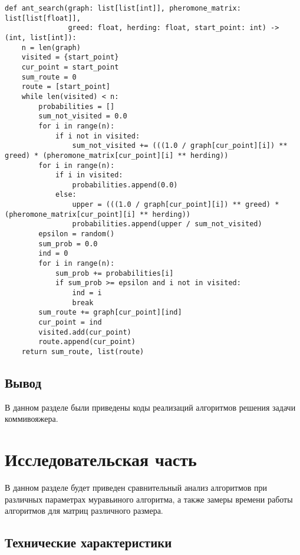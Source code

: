 \documentclass{bmstu}
\begin{document}
\clearpage
\begin{center}
\captionsetup{justification=raggedright,singlelinecheck=off}
\begin{lstlisting}[label=lst:ants_alg,caption=Реализация решения задачи коммивояжера муравьиным алгоритмом]
def ant_search(graph: list[list[int]], pheromone_matrix: list[list[float]],
               greed: float, herding: float, start_point: int) -> (int, list[int]):
    n = len(graph)
    visited = {start_point}
    cur_point = start_point
    sum_route = 0
    route = [start_point]
    while len(visited) < n:
        probabilities = []
        sum_not_visited = 0.0
        for i in range(n):
            if i not in visited:
                sum_not_visited += (((1.0 / graph[cur_point][i]) ** greed) * (pheromone_matrix[cur_point][i] ** herding))
        for i in range(n):
            if i in visited:
                probabilities.append(0.0)
            else:
                upper = (((1.0 / graph[cur_point][i]) ** greed) * (pheromone_matrix[cur_point][i] ** herding))
                probabilities.append(upper / sum_not_visited)
        epsilon = random()
        sum_prob = 0.0
        ind = 0
        for i in range(n):
            sum_prob += probabilities[i]
            if sum_prob >= epsilon and i not in visited:
                ind = i
                break
        sum_route += graph[cur_point][ind]
        cur_point = ind
        visited.add(cur_point)
        route.append(cur_point)
    return sum_route, list(route)
\end{lstlisting}
\end{center}

\clearpage

\section*{Вывод}
В данном разделе были приведены коды реализаций алгоритмов решения задачи коммивояжера.



\chapter{Исследовательская часть}
В данном разделе будет приведен сравнительный анализ алгоритмов при различных параметрах муравьиного алгоритма, а также замеры времени работы алгоритмов для матриц различного размера.

\section{Технические характеристики}
\end{document}
